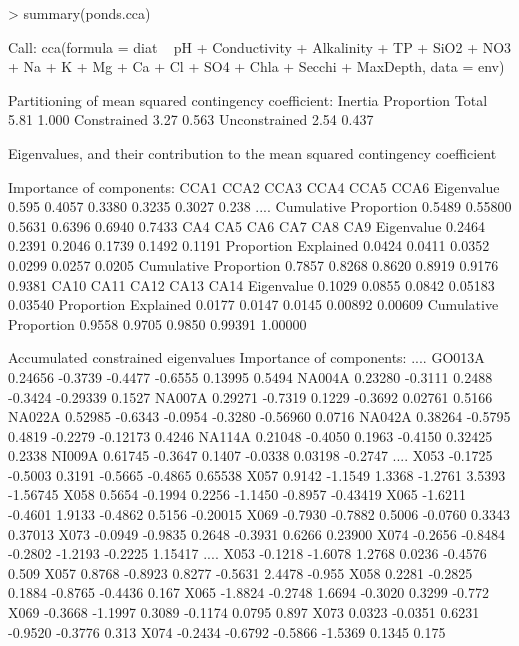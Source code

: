 \documentclass[a4paper,10pt]{article}
\begin{document}
\begin{Schunk}
\begin{Sinput}
> summary(ponds.cca)
\end{Sinput}
\end{Schunk}
\begin{Schunk}
\begin{Soutput}
Call:
cca(formula = diat ~ pH + Conductivity + Alkalinity + TP + SiO2 +      NO3 + Na + K + Mg + Ca + Cl + SO4 + Chla + Secchi + MaxDepth,      data = env) 

Partitioning of mean squared contingency coefficient:
              Inertia Proportion
Total            5.81      1.000
Constrained      3.27      0.563
Unconstrained    2.54      0.437

Eigenvalues, and their contribution to the mean squared contingency coefficient 

Importance of components:
                       CCA1   CCA2   CCA3   CCA4   CCA5  CCA6
Eigenvalue            0.595 0.4057 0.3380 0.3235 0.3027 0.238
....
Cumulative Proportion 0.5489 0.55800 0.5631 0.6396 0.6940 0.7433
                         CA4    CA5    CA6    CA7    CA8    CA9
Eigenvalue            0.2464 0.2391 0.2046 0.1739 0.1492 0.1191
Proportion Explained  0.0424 0.0411 0.0352 0.0299 0.0257 0.0205
Cumulative Proportion 0.7857 0.8268 0.8620 0.8919 0.9176 0.9381
                        CA10   CA11   CA12    CA13    CA14
Eigenvalue            0.1029 0.0855 0.0842 0.05183 0.03540
Proportion Explained  0.0177 0.0147 0.0145 0.00892 0.00609
Cumulative Proportion 0.9558 0.9705 0.9850 0.99391 1.00000

Accumulated constrained eigenvalues
Importance of components:
....
GO013A  0.24656 -0.3739 -0.4477 -0.6555  0.13995  0.5494
NA004A  0.23280 -0.3111  0.2488 -0.3424 -0.29339  0.1527
NA007A  0.29271 -0.7319  0.1229 -0.3692  0.02761  0.5166
NA022A  0.52985 -0.6343 -0.0954 -0.3280 -0.56960  0.0716
NA042A  0.38264 -0.5795  0.4819 -0.2279 -0.12173  0.4246
NA114A  0.21048 -0.4050  0.1963 -0.4150  0.32425  0.2338
NI009A  0.61745 -0.3647  0.1407 -0.0338  0.03198 -0.2747
....
X053 -0.1725 -0.5003  0.3191 -0.5665 -0.4865  0.65538
X057  0.9142 -1.1549  1.3368 -1.2761  3.5393 -1.56745
X058  0.5654 -0.1994  0.2256 -1.1450 -0.8957 -0.43419
X065 -1.6211 -0.4601  1.9133 -0.4862  0.5156 -0.20015
X069 -0.7930 -0.7882  0.5006 -0.0760  0.3343  0.37013
X073 -0.0949 -0.9835  0.2648 -0.3931  0.6266  0.23900
X074 -0.2656 -0.8484 -0.2802 -1.2193 -0.2225  1.15417
....
X053 -0.1218 -1.6078  1.2768  0.0236 -0.4576  0.509
X057  0.8768 -0.8923  0.8277 -0.5631  2.4478 -0.955
X058  0.2281 -0.2825  0.1884 -0.8765 -0.4436  0.167
X065 -1.8824 -0.2748  1.6694 -0.3020  0.3299 -0.772
X069 -0.3668 -1.1997  0.3089 -0.1174  0.0795  0.897
X073  0.0323 -0.0351  0.6231 -0.9520 -0.3776  0.313
X074 -0.2434 -0.6792 -0.5866 -1.5369  0.1345  0.175
\end{Soutput}
\end{Schunk}
\end{document}
